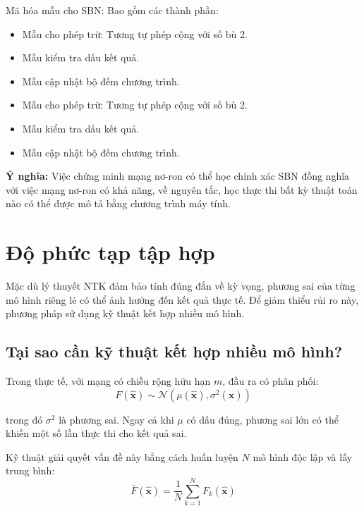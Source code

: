 Mã hóa mẫu cho SBN: Bao gồm các thành phần:
\begin{itemize}
    \item Mẫu cho phép trừ: Tương tự phép cộng với số bù 2.
    \item Mẫu kiểm tra dấu kết quả.
    \item Mẫu cập nhật bộ đếm chương trình.
    \item Mẫu cho phép trừ: Tương tự phép cộng với số bù 2.
    \item Mẫu kiểm tra dấu kết quả.
    \item Mẫu cập nhật bộ đếm chương trình.
\end{itemize}

\textbf{Ý nghĩa:} Việc chứng minh mạng nơ-ron có thể học chính xác SBN đồng nghĩa với việc mạng nơ-ron có khả năng, về nguyên tắc, học thực thi bất kỳ thuật toán nào có thể được mô tả bằng chương trình máy tính.

\section{Độ phức tạp tập hợp}

Mặc dù lý thuyết NTK đảm bảo tính đúng đắn về kỳ vọng, phương sai của từng mô hình riêng lẻ có thể ảnh hưởng đến kết quả thực tế. Để giảm thiểu rủi ro này, phương pháp sử dụng kỹ thuật kết hợp nhiều mô hình.

\subsection{Tại sao cần kỹ thuật kết hợp nhiều mô hình?}

Trong thực tế, với mạng có chiều rộng hữu hạn $m$, đầu ra có phân phối:
\begin{equation}
    F(\hat{\mathbf{x}}) \sim \mathcal{N}(\mu(\hat{\mathbf{x}}), \sigma^2(\hat{\mathbf{x}}))
\end{equation}

trong đó $\sigma^2$ là phương sai. Ngay cả khi $\mu$ có dấu đúng, phương sai lớn có thể khiến một số lần thực thi cho kết quả sai.

\vspace{0.2cm}

Kỹ thuật giải quyết vấn đề này bằng cách huấn luyện $N$ mô hình độc lập và lấy trung bình:
\begin{equation}
    \bar{F}(\hat{\mathbf{x}}) = \frac{1}{N} \sum_{k=1}^{N} F_k(\hat{\mathbf{x}})
\end{equation}

